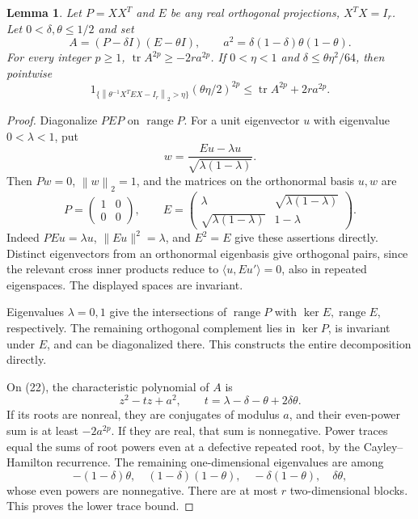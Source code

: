 \documentclass[11pt]{article}
\newtheorem{lemma}[theorem]{Lemma}
\theoremstyle{definition}
\DeclareMathOperator{\tr}{tr}
\newcommand{\norm}[1]{\left\lVert#1\right\rVert_2}
\begin{document}
\begin{lemma}\label{lem:transfer}
Let \(P=XX^T\) and \(E\) be any real orthogonal projections,
\(X^TX=I_r\). Let \(0<\delta,\theta\le1/2\) and set
\[
 A=(P-\delta I)(E-\theta I),\qquad
 a^2=\delta(1-\delta)\theta(1-\theta).
\]
For every integer \(p\ge1\), \(\tr A^{2p}\ge-2r a^{2p}\).
If \(0<\eta<1\) and \(\delta\le\theta\eta^2/64\), then pointwise
\[
 1_{\{\norm{\theta^{-1}X^TEX-I_r}>\eta\}}
          (\theta\eta/2)^{2p}
                \le\tr A^{2p}+2r a^{2p}.                        \tag{21}
\]
\end{lemma}
\begin{proof}
Diagonalize \(PEP\) on \(\operatorname{range}P\).
For a unit eigenvector \(u\) with eigenvalue \(0<\lambda<1\), put
\[
 w=\frac{Eu-\lambda u}{\sqrt{\lambda(1-\lambda)}}.
\]
Then \(Pw=0\), \(\norm w=1\), and the matrices on the orthonormal
basis \(u,w\) are
\[
 P=\begin{pmatrix}1&0\\0&0\end{pmatrix},\qquad
 E=\begin{pmatrix}\lambda&\sqrt{\lambda(1-\lambda)}\\
                  \sqrt{\lambda(1-\lambda)}&1-\lambda\end{pmatrix}.
                                                                  \tag{22}
\]
Indeed \(PEu=\lambda u\), \(\|Eu\|^2=\lambda\), and \(E^2=E\)
give these assertions directly. Distinct eigenvectors from an
orthonormal eigenbasis give orthogonal pairs, since the relevant
cross inner products reduce to \(\langle u,Eu'\rangle=0\),
also in repeated eigenspaces. The displayed spaces are invariant.

Eigenvalues \(\lambda=0,1\) give the intersections of
\(\operatorname{range}P\) with \(\ker E,\operatorname{range}E\),
respectively. The remaining orthogonal complement lies in \(\ker P\),
is invariant under \(E\), and can be diagonalized there.
This constructs the entire decomposition directly.

On (22), the characteristic polynomial of \(A\) is
\[
 z^2-tz+a^2,\qquad t=\lambda-\delta-\theta+2\delta\theta.           \tag{23}
\]
If its roots are nonreal, they are conjugates of modulus \(a\),
and their even-power sum is at least \(-2a^{2p}\).
If they are real, that sum is nonnegative.
Power traces equal the sums of root powers even at a defective
repeated root, by the Cayley--Hamilton recurrence.
The remaining one-dimensional eigenvalues are among
\[
 -(1-\delta)\theta,\quad (1-\delta)(1-\theta),\quad
                  -\delta(1-\theta),\quad \delta\theta,
\]
whose even powers are nonnegative. There are at most \(r\)
two-dimensional blocks. This proves the lower trace bound.


\end{proof}
\end{document}
